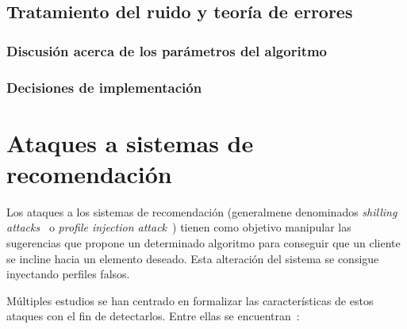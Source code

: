 \subsection{Tratamiento del ruido y teoría de errores}

\subsubsection{Discusión acerca de los parámetros del algoritmo}

\subsubsection{Decisiones de implementación}




\section{Ataques a sistemas de recomendación}

Los ataques a los sistemas de recomendación (generalmene denominados \textit{shilling attacks}~\cite{mingdan2018ShillingAttacksAReview} o \textit{profile injection attack}~\cite{Mobasher2006Thesis}) tienen como objetivo manipular las sugerencias que propone un determinado algoritmo para conseguir que un cliente se incline hacia un elemento deseado. Esta alteración del sistema se consigue inyectando perfiles falsos.

Múltiples estudios se han centrado en formalizar las características de estos ataques con el fin de detectarlos. Entre ellas se encuentran~\cite{mingdan2018ShillingAttacksAReview}:


